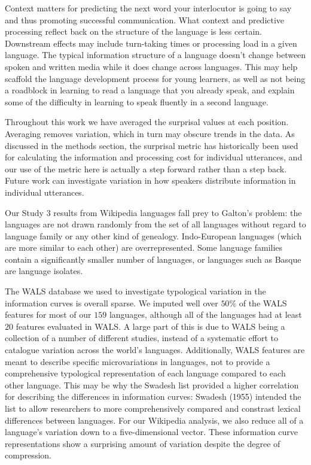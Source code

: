 \documentclass[
  english,
  man,floatsintext]{apa6}
\begin{document}
Context matters for predicting the next word your interlocutor is going to say and thus promoting successful communication. What context and predictive processing reflect back on the structure of the language is less certain. Downstream effects may include turn-taking times or processing load in a given language. The typical information structure of a language doesn't change between spoken and written media while it does change across languages. This may help scaffold the language development process for young learners, as well as not being a roadblock in learning to read a language that you already speak, and explain some of the difficulty in learning to speak fluently in a second language.

Throughout this work we have averaged the surprisal values at each position. Averaging removes variation, which in turn may obscure trends in the data. As discussed in the methods section, the surprisal metric has historically been used for calculating the information and processing cost for individual utterances, and our use of the metric here is actually a step forward rather than a step back. Future work can investigate variation in how speakers distribute information in individual utterances.

Our Study 3 results from Wikipedia languages fall prey to Galton's problem: the languages are not drawn randomly from the set of all languages without regard to language family or any other kind of genealogy. Indo-European languages (which are more similar to each other) are overrepresented. Some language families contain a significantly smaller number of languages, or languages such as Basque are language isolates.

The WALS database we used to investigate typological variation in the information curves is overall sparse. We imputed well over \(50\%\) of the WALS features for most of our \(159\) languages, although all of the languages had at least \(20\) features evaluated in WALS. A large part of this is due to WALS being a collection of a number of different studies, instead of a systematic effort to catalogue variation across the world's languages. Additionally, WALS features are meant to describe specific microvariations in languages, not to provide a comprehensive typological representation of each language compared to each other language. This may be why the Swadesh list provided a higher correlation for describing the differences in information curves: Swadesh (1955) intended the list to allow researchers to more comprehensively compared and constrast lexical differences between languages. For our Wikipedia analysis, we also reduce all of a language's variation down to a five-dimensional vector. These information curve representations show a surprising amount of variation despite the degree of compression.
\end{document}
